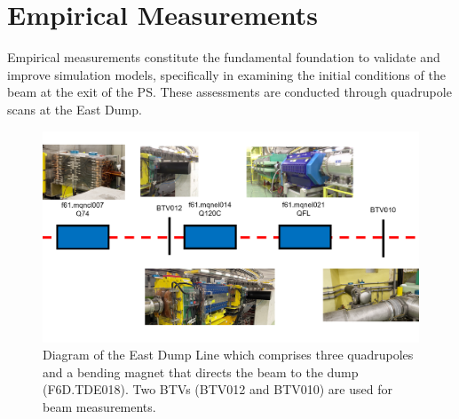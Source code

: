 \section{Empirical Measurements}
\label{section:Empirical_measurements}


Empirical measurements constitute the fundamental foundation to validate and improve simulation models, specifically in examining the initial conditions of the beam at the exit of the PS. These assessments are conducted through quadrupole scans at the East Dump.

\begin{figure}[htbp]
\centering
\includegraphics[width=\linewidth]{03_Empirical_Measurements/images/East_dump_line.png}
\caption{Diagram of the East Dump Line which comprises three quadrupoles and a bending magnet that directs the beam to the dump (F6D.TDE018). Two BTVs (BTV012 and BTV010) are used for beam measurements.}
\label{fig:East_dump_line}
\end{figure}

